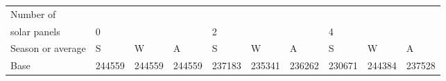 \begin{table}[h] 
\centering 
\begin{tabular}{l|lll|lll|lll}Number of \\ solar panels&0& & &2& & &4& & \\ \hline 
Season or average & S & W & A & S & W & A & S & W & A \\ \hline 
Base&244559&244559&244559&237183&235341&236262&230671&244384&237528 \\ 
\end{tabular} 
\end{table}